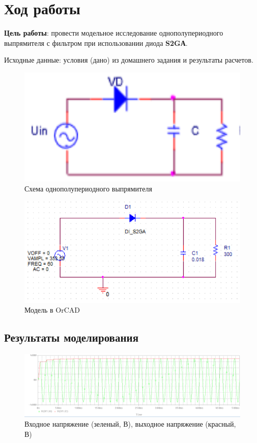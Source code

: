 \chapter{Ход работы}

\textbf{Цель работы}: провести модельное исследование однополупериодного выпрямителя с фильтром при использовании диода \textbf{S2GА}.

Исходные данные: условия (дано) из домашнего задания и результаты расчетов.

\begin{figure}[h!]
	\centering
	\caption{Схема однополупериодного выпрямителя}
	\includegraphics{images/scheme1.png}
\end{figure}

\begin{figure}[h!]
	\centering
	\caption{Модель в OrCAD}
	\includegraphics{images/scheme2.png}
\end{figure}

\newpage
\section{Результаты моделирования}

\begin{figure}[h!]
	\centering
	\caption{Входное напряжение (зеленый, В), выходное напряжение (красный, В)}
	\includegraphics{images/model1.png}
\end{figure}


